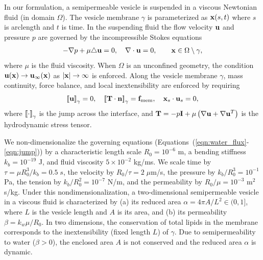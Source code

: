 \documentclass[prb,preprint,showpacs,preprintnumbers,amsmath,amssymb,longbibliography]{revtex4-1}
\begin{document}
In our formulation, a semipermeable vesicle is suspended in a viscous
Newtonian fluid (in domain $\Omega$).  The vesicle membrane $\gamma$ is
parameterized as $\mathbf{x}(s,t)$ where $s$ is arclength and $t$ is time. In
the suspending fluid the flow velocity $\mathbf{u}$ and pressure $p$ are
governed by the incompressible Stokes equations
\begin{align}
  \label{eqn:governing}
  -\nabla p + \mu \triangle \mathbf{u} = 0, \quad
  \nabla \cdot \mathbf{u} = 0, \qquad \mathbf{x} \in \Omega \setminus \gamma,
\end{align}
where $\mu$ is the fluid viscosity. When $\Omega$ is an unconfined
geometry, the condition $\mathbf{u}(\mathbf{x}) \rightarrow \mathbf{u}_\infty(\mathbf{x})$ as $|\mathbf{x}|
\rightarrow \infty$ is enforced. 
%
Along the vesicle membrane $\gamma$,
mass continuity, force balance, and local inextensibility are enforced
by requiring
\begin{align}
  \label{eqn:jump}
  \left[\!\left[ \mathbf{u} \right]\!\right]_\gamma = 0, \quad
  \left[\!\left[ \mathbf{T}\cdot\mathbf{n} \right]\!\right]_\gamma = \mathbf{f}_\mathrm{mem}, \quad
  \mathbf{x}_s \cdot \mathbf{u}_s = 0,
\end{align}
where 
$\left[\!\left[ \cdot \right]\!\right]_\gamma$ is the jump across the interface, and $\mathbf{T} = -p
\mathbf{I} + \mu \left(\nabla \mathbf{u} + \nabla \mathbf{u}^T \right)$ is the
hydrodynamic stress tensor.


We non-dimensionalize the governing equations (Equations~(\ref{eqn:water_flux}-\ref{eqn:jump})) by a
characteristic length scale $R_0 = 10^{-6}$ m, a bending stiffness $k_b
= 10^{-19}$ J, and fluid viscosity $5 \times 10^{-2}$ kg/ms. We scale
time by $\tau = \mu R_0^3/k_b = 0.5\;s$, the velocity by $R_0/\tau =
2\;\mu$m/s, the pressure by $k_b/R_0^3 = 10^{-1}$ Pa, the tension by
$k_b/R_0^2 = 10^{-7}$ N/m, and the permeability by $R_0/\mu = 10^{-3}$
m$^2$s/kg. Under this nondimensionalization, a two-dimensional
semipermeable vesicle in a viscous fluid is characterized by (a) its
reduced area $\alpha = 4\pi A/L^2 \in (0,1]$, where $L$ is the vesicle
length and $A$ is its area, and (b) its permeability $\beta = k_w \mu
/R_0$. 
In two dimensions, the conservation of total lipids in the membrane corresponds to the inextensibility (fixed length $L$) of $\gamma$.
Due to semipermeability to water ($\beta>0$),  the enclosed area $A$ is not conserved and the reduced area $\alpha$ is dynamic. 
\end{document}
